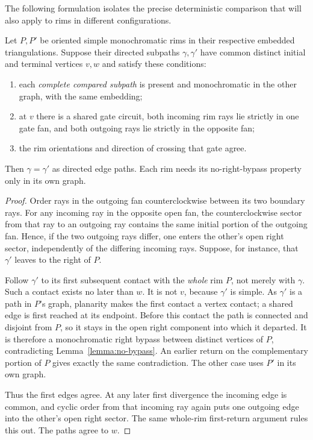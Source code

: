 The following formulation isolates the precise deterministic comparison
that will also apply to rims in different configurations.

\begin{lemma}\label{lemma:gate-consistency}
Let $P,P'$ be oriented simple monochromatic rims in their respective
embedded triangulations.  Suppose their directed subpaths $\gamma,
\gamma'$ have common distinct initial and terminal vertices $v,w$ and
satisfy these conditions:
\begin{enumerate}[label=\textup{(\roman*)}]
\item each \emph{complete compared subpath} is present and monochromatic
in the other graph, with the same embedding;
\item at $v$ there is a shared gate circuit, both incoming rim rays lie
strictly in one gate fan, and both outgoing rays lie strictly in the
opposite fan;
\item the rim orientations and direction of crossing that gate agree.
\end{enumerate}
Then $\gamma=\gamma'$ as directed edge paths.  Each rim needs its
no-right-bypass property only in its own graph.
\end{lemma}

\begin{proof}
Order rays in the outgoing fan counterclockwise between its two boundary
rays.  For any incoming ray in the opposite open fan, the
counterclockwise sector from that ray to an outgoing ray contains the
same initial portion of the outgoing fan.  Hence, if the two outgoing
rays differ, one enters the other's open right sector, independently of
the differing incoming rays.  Suppose, for instance, that $\gamma'$
leaves to the right of $P$.

Follow $\gamma'$ to its first subsequent contact with the \emph{whole}
rim $P$, not merely with $\gamma$.  Such a contact exists no later than
$w$.  It is not $v$, because $\gamma'$ is simple.  As $\gamma'$ is a path
in $P$'s graph, planarity makes the first contact a vertex contact; a
shared edge is first reached at its endpoint.  Before this contact the
path is connected and disjoint from $P$, so it stays in the open right
component into which it departed.  It is therefore a monochromatic
right bypass between distinct vertices of $P$, contradicting
Lemma~\ref{lemma:no-bypass}.  An earlier return on the complementary
portion of $P$ gives exactly the same contradiction.  The other case
uses $P'$ in its own graph.

Thus the first edges agree.  At any later first divergence the incoming
edge is common, and cyclic order from that incoming ray again puts one
outgoing edge into the other's open right sector.  The same whole-rim
first-return argument rules this out.  The paths agree to $w$.
\end{proof}

